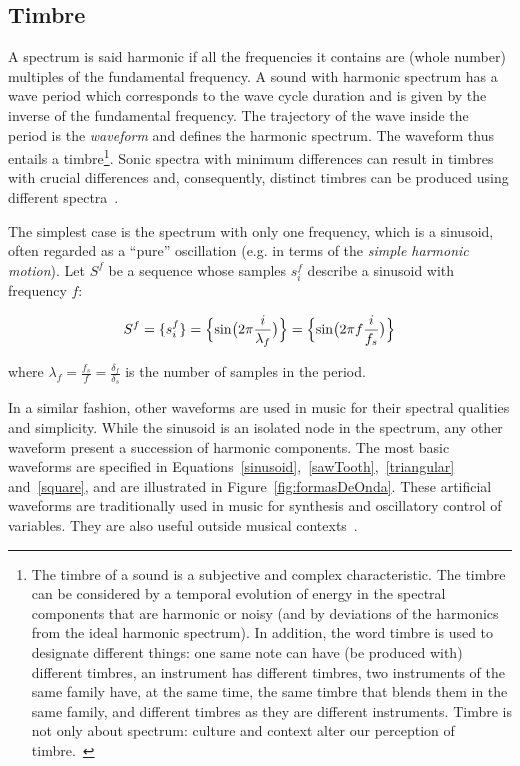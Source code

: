 \subsection{Timbre}
A spectrum is said harmonic if all the frequencies it contains are (whole number) multiples of the fundamental frequency.
A sound with harmonic spectrum has a wave period which corresponds to the wave cycle duration and is given by the inverse of the fundamental frequency. The trajectory of the wave inside the period is the \emph{waveform} and defines the harmonic spectrum.
The waveform thus entails a timbre\footnote{The timbre of a sound is a subjective and complex characteristic. The timbre can be considered by a temporal evolution of energy in the spectral components that are harmonic or noisy (and by deviations of the harmonics from the ideal harmonic spectrum). In addition, the word timbre is used to designate different things: one same note can have (be produced with) different timbres, an instrument has different timbres, two instruments of the same family have, at the same time, the same timbre that blends them in the same family, and different timbres as they are different instruments. Timbre is not only about spectrum: culture and context alter our perception of timbre.~\cite{Roederer}}. Sonic spectra with minimum differences can result in timbres with crucial differences and, consequently, distinct timbres can be produced using different spectra~\cite{Roederer}.

The simplest case is the spectrum with only one frequency, which is a sinusoid, often regarded as a ``pure'' oscillation (e.g. in terms of the \emph{simple harmonic motion}).
Let $S^f$ be a sequence whose samples $s_i^f$ describe a sinusoid with frequency $f$:

\begin{equation}\label{sinusoid}
     S^f=\{ s^f_i \}=\Bigl\{ \sin\bigl(2\pi \frac{i}{\lambda_f} \bigr)  \Bigr\} = \Bigl\{ \sin\bigl(2\pi f \frac{i}{f_s}\bigr)  \Bigr\} 
\end{equation}

\noindent where $\lambda_f=\frac{f_s}{f}=\frac{\delta_f}{\delta_s}$ is the number of samples in the period.

In a similar fashion, other waveforms are used in music for their spectral qualities and simplicity.
While the sinusoid is an isolated node in the spectrum, any other waveform present a succession of harmonic components.
The most basic waveforms are specified in Equations~\ref{sinusoid},~\ref{sawTooth},~\ref{triangular} and~\ref{square}, and are illustrated in Figure~\ref{fig:formasDeOnda}.
These artificial waveforms are traditionally used in music for synthesis and oscillatory control of variables. They are also useful outside musical contexts~\cite{Openheim}.

